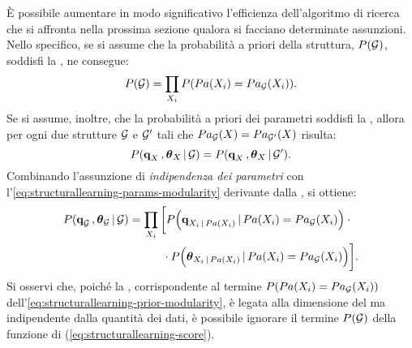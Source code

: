 \`E possibile aumentare in modo significativo l'efficienza dell'algoritmo di ricerca che si affronta nella prossima sezione qualora si facciano determinate assunzioni. Nello specifico, se si assume che la probabilità a priori della struttura, $P(\mathcal{G})$, soddisfi la \emph{}, ne consegue:
\begin{equation}\label{eq:structurallearning-prior-modularity}
P(\mathcal{G})=\prod_{\mathnormal{X}_i} P(Pa(\mathnormal{X}_i) = Pa_{\mathcal{G}}(\mathnormal{X}_i))\text{.}
\end{equation}
Se si assume, inoltre, che la probabilità a priori dei parametri soddisfi la \emph{}, allora per ogni due strutture $\mathcal{G}$ e $\mathcal{G}^\prime$ tali che $Pa_{\mathcal{G}}(\mathnormal{X}) = Pa_{\mathcal{G}^\prime}(\mathnormal{X})$ risulta:
\begin{equation}\label{eq:structurallearning-params-modularity}
P(\boldsymbol{\textbf{\text{q}}}_{\mathnormal{X}}\,,\boldsymbol{\textbf{\text{$\theta$}}}_{\mathnormal{X}}\,\arrowvert\,\mathcal{G}) = P(\boldsymbol{\textbf{\text{q}}}_{\mathnormal{X}}\,,\boldsymbol{\textbf{\text{$\theta$}}}_{\mathnormal{X}}\,\arrowvert\,\mathcal{G}^\prime)\text{.}
\end{equation}
Combinando l'assunzione di \emph{indipendenza dei parametri} con l'\autoref{eq:structurallearning-params-modularity} derivante dalla \emph{}, si ottiene:
\begin{align}\label{eq:structurallearning-params-posterior}
P(\boldsymbol{\textbf{\text{q}}}_{\mathcal{G}}\,,\boldsymbol{\textbf{\text{$\theta$}}}_{\mathcal{G}}\,\arrowvert\,\mathcal{G}) &= \prod_{\mathnormal{X}_i} \bigg[ P\Big(\boldsymbol{\textbf{\text{q}}}_{\mathnormal{X}_i\,\arrowvert\,Pa(\mathnormal{X}_i)}\,\arrowvert\,Pa(\mathnormal{X}_i)=Pa_{\mathcal{G}}(\mathnormal{X}_i)\Big) \cdot \bigg.\nonumber\\
& \quad \bigg.{} \qquad \cdot P\Big(\boldsymbol{\textbf{\text{$\theta$}}}_{\mathnormal{X}_i\,\arrowvert\,Pa(\mathnormal{X}_i)}\,\arrowvert\,Pa(\mathnormal{X}_i)=Pa_{\mathcal{G}}(\mathnormal{X}_i)\Big) \bigg]\text{.}
\end{align}
Si osservi che, poiché la \emph{}, corrispondente al termine $P(Pa(\mathnormal{X}_i) = Pa_{\mathcal{G}}(\mathnormal{X}_i))$ dell'\autoref{eq:structurallearning-prior-modularity}, è legata alla dimensione del  ma indipendente dalla quantità dei dati, è possibile ignorare il termine $P(\mathcal{G})$ della funzione di  (\autoref{eq:structurallearning-score}).

